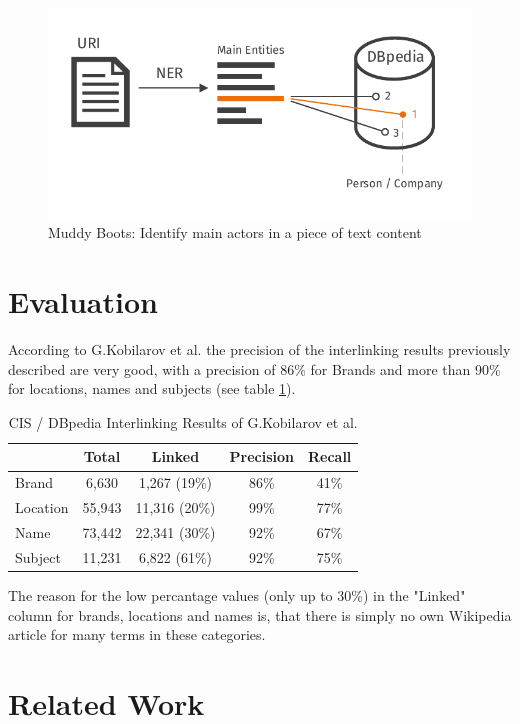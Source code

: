 \documentclass{llncs}
\begin{document}
\begin{figure}[!h]
  \includegraphics[width=\textwidth]{images/muddy_boots_dark}
  \caption{Muddy Boots: Identify main actors in a piece of text content}
  \label{fig:muddy}
\end{figure}

\section{Evaluation}

According to G.Kobilarov et al. \cite{mmsw} the precision of the interlinking results previously described are very good, with a precision of 86\% for Brands and more than 90\% for locations, names and subjects (see table \ref{tab:evaluation}).
\begin{table}
\centering
\begin{tabular}{lcccc}
  \hline
  \textbf{ } & \textbf{Total} & \textbf{Linked} & \textbf{Precision} & \textbf{Recall} \\
  \hline
  Brand & 6,630 & 1,267 (19\%) & 86\% & 41\% \\
  Location & 55,943 & 11,316 (20\%) & 99\% & 77\% \\
  Name & 73,442 & 22,341 (30\%) & 92\% & 67\% \\
  Subject & 11,231 & 6,822 (61\%) & 92\% & 75\% \\
  \hline
\end{tabular}
\caption{CIS / DBpedia Interlinking Results of G.Kobilarov et al. \cite{mmsw}}
\label{tab:evaluation}
\end{table}

The reason for the low percantage values (only up to 30\%) in the "Linked" column for brands, locations and names is, that there is simply no own Wikipedia article for many terms in these categories.


\section{Related Work}
\end{document}
